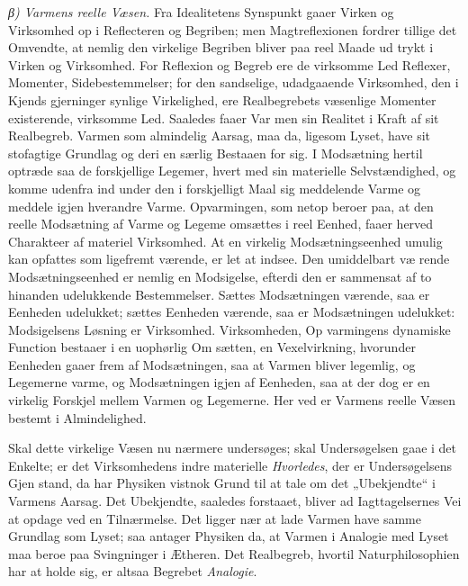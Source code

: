 \documentclass[12pt,a4paper]{book}
\newcommand{\subrunin}[1]{\emph{#1}\hspace{0.4em}}
\begin{document}
\subrunin{β) Varmens reelle Væsen.} Fra Idealitetens Synspunkt gaaer
Virken og Virksomhed op i Reflecteren og
Begriben; men Magtreflexionen fordrer tillige det Omvendte, at nemlig
den virkelige Begriben bliver paa reel Maade ud\-%
trykt i Virken og Virksomhed. For Reflexion og Begreb ere de virksomme
Led Reflexer, Momenter, Sidebestemmelser; for den sandselige,
udadgaaende Virksomhed, den i Kjends\-%
gjerninger synlige Virkelighed, ere Realbegrebets væsenlige Momenter
existerende, virksomme Led. Saaledes faaer Var\-%
men sin Realitet i Kraft af sit Realbegreb. Varmen som almindelig
Aarsag, maa da, ligesom Lyset, have sit stofagtige Grundlag og deri en
særlig Bestaaen for sig. I Modsætning hertil optræde saa de
forskjellige Legemer, hvert med sin materielle Selvstændighed, og komme
udenfra ind under den i forskjelligt Maal sig meddelende Varme og
meddele igjen hverandre Varme. Opvarmingen, som netop beroer paa, at
den reelle Modsætning af Varme og Legeme omsættes i reel Eenhed, faaer
herved Charakteer af materiel Virksomhed. At en virkelig
Modsætningseenhed umulig kan opfattes som ligefremt værende, er let at
indsee. Den umiddelbart væ\-%
rende Modsætningseenhed er nemlig en Modsigelse, efterdi den er
sammensat af to hinanden udelukkende Bestemmelser. Sættes Modsætningen
værende, saa er Eenheden udelukket; sættes Eenheden værende, saa er
Modsætningen udelukket: Modsigelsens Løsning er Virksomhed.
Virksomheden, Op\-%
varmingens dynamiske Function bestaaer i en uophørlig Om\-%
sætten, en Vexelvirkning, hvorunder Eenheden gaaer frem af
Modsætningen, saa at Varmen bliver legemlig, og Legemerne varme, og
Modsætningen igjen af Eenheden, saa at der dog er en virkelig Forskjel
mellem Varmen og Legemerne. Her\-%
ved er Varmens reelle Væsen bestemt i Almindelighed.

Skal dette virkelige Væsen nu nærmere undersøges; skal Undersøgelsen
gaae i det Enkelte; er det Virksomhedens indre materielle
\emph{Hvorledes}, der er Undersøgelsens Gjen\-%
stand, da har Physiken vistnok Grund til at tale om det „Ubekjendte“ i
Varmens Aarsag. Det Ubekjendte, saaledes
forstaaet, bliver ad Iagttagelsernes Vei at opdage ved en Tilnærmelse.
Det ligger nær at lade Varmen have samme Grundlag som Lyset; saa
antager Physiken da, at Varmen i Analogie med Lyset maa beroe paa
Svingninger i Ætheren. Det Realbegreb, hvortil Naturphilosophien har at
holde sig, er altsaa Begrebet \emph{Analogie}.
\end{document}
